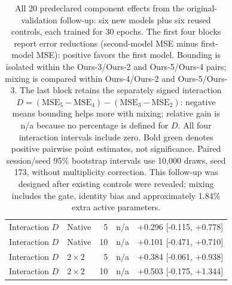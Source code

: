 \begin{table}[H]
\begin{tabular}{@{}llrrl@{}}
\midrule
Interaction $D$ & Native & 5 & n/a & +0.296 [-0.115, +0.778] \\
Interaction $D$ & Native & 10 & n/a & +0.101 [-0.471, +0.710] \\
Interaction $D$ & $2\!\times\!2$ & 5 & n/a & +0.384 [-0.061, +0.938] \\
Interaction $D$ & $2\!\times\!2$ & 10 & n/a & +0.503 [-0.175, +1.344] \\
\bottomrule\end{tabular}
\caption{All 20 predeclared component effects from the original-validation follow-up: six new models plus six reused controls, each trained for 30 epochs. The first four blocks report error reductions (second-model MSE minus first-model MSE): positive favors the first model. Bounding is isolated within the Ours-3/Ours-2 and Ours-5/Ours-4 pairs; mixing is compared within Ours-4/Ours-2 and Ours-5/Ours-3. The last block retains the separately signed interaction $D=(\mathrm{MSE}_5-\mathrm{MSE}_4)-(\mathrm{MSE}_3-\mathrm{MSE}_2)$: negative means bounding helps more with mixing; relative gain is n/a because no percentage is defined for $D$. All four interaction intervals include zero. Bold green denotes positive pairwise point estimates, not significance. Paired session/seed 95\% bootstrap intervals use 10,000 draws, seed 173, without multiplicity correction. This follow-up was designed after existing controls were revealed; mixing includes the gate, identity bias and approximately 1.84\% extra active parameters.}
\label{tab:spatial-versions-components}
\end{table}
